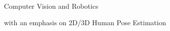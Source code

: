 
\begin{cventries}

  \cventry
    {Computer Vision and Robotics} %
    {} %
    {} %
    {} %
    {
      \begin{cvitems} %
        \item {with an emphasis on 2D/3D Human Pose Estimation}
      \end{cvitems}
    }

\end{cventries}
